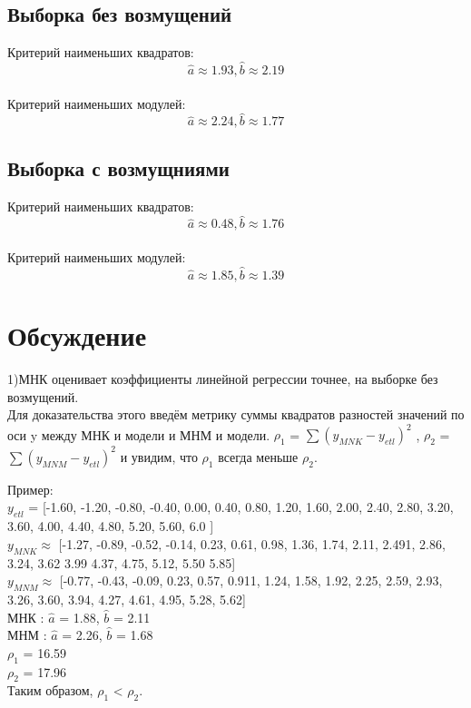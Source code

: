 \documentclass[a4]{article}
\begin{document}
		\subsection{Выборка без возмущений}
			Критерий наименьших квадратов:\\
			$$\hat{a} \approx 1.93,\hat{b} \approx 2.19$$\\
			
			Критерий наименьших модулей:\\
			$$\hat{a} \approx 2.24 ,\hat{b} \approx 1.77$$
		\subsection{Выборка с возмущниями}
			Критерий наименьших квадратов:\\
			$$\hat{a} \approx 0.48,\hat{b} \approx 1.76$$\\
			
			Критерий наименьших модулей:\\
			$$\hat{a} \approx 1.85 ,\hat{b} \approx 1.39$$
		
	\section{Обсуждение}
		1)МНК оценивает коэффициенты линейной регрессии точнее, на выборке без возмущений.\\
		Для доказательства этого введём метрику суммы квадратов разностей значений по оси y между МНК и модели и МНМ и модели. $\rho_1$ = $\sum (y_{MNK} - y_{etl})^2$ , $\rho_2$ = $\sum (y_{MNM} - y_{etl})^2$ и увидим, что $\rho_1$ всегда меньше $\rho_2$.\\ 
		\begin{center}
			Пример: \\
			$y_{etl}$ = [-1.60, -1.20, -0.80, -0.40,  0.00,   0.40,  0.80, 1.20,  1.60,  2.00,   2.40,  2.80,  3.20,  3.60, 4.00,  4.40,  4.80,  5.20,  5.60,  6.0 ]\\
			$y_{MNK} \approx $ [-1.27, -0.89, -0.52,  -0.14,  0.23,  0.61, 0.98,  1.36,  1.74,  2.11,  2.491,  2.86, 3.24,  3.62  3.99   4.37,  4.75, 5.12, 5.50  5.85]\\
			$y_{MNM} \approx$ [-0.77, -0.43, -0.09,  0.23,  0.57,  0.911,  1.24,  1.58,  1.92,  2.25,  2.59,  2.93,  3.26,  3.60,  3.94,  4.27,  4.61,  4.95,  5.28,  5.62]\\
			
			МНК : $\hat{a}$ = 1.88, $\hat{b}$ = 2.11\\
			МНМ : $\hat{a}$ = 2.26, $\hat{b}$ = 1.68\\
			
			$\rho_1$ = 16.59\\
			$\rho_2$ = 17.96\\
			
			Таким образом, $\rho_1$ < $\rho_2$.
		\end{center}
		
\end{document}
